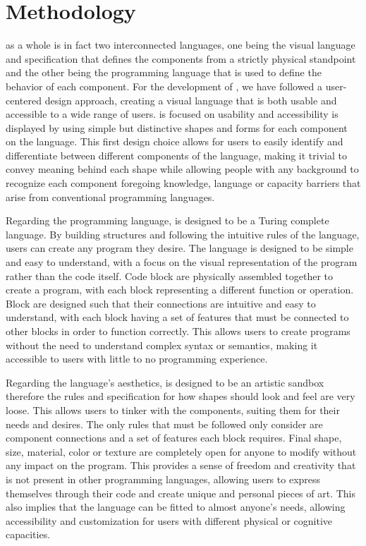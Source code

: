 \section{Methodology}
\label{sec:methodology}

\sculpt as a whole is in fact two interconnected languages, one being the visual language and specification that defines the components from a strictly physical standpoint and the other being the programming language that is used to define the behavior of each component.
For the development of \sculpt, we have followed a user-centered design approach, creating a visual language that is both usable and accessible to a wide range of users.
\sculpt is focused on usability and accessibility is displayed by using simple but distinctive shapes and forms for each component on the language.
This first design choice allows for users to easily identify and differentiate between different components of the language, making it trivial to convey meaning behind each shape while allowing people with any background to recognize each component foregoing knowledge, language or capacity barriers that arise from conventional programming languages.

Regarding the programming language, \sculpt is designed to be a Turing complete language.
By building structures and following the intuitive rules of the language, users can create any program they desire.
The language is designed to be simple and easy to understand, with a focus on the visual representation of the program rather than the code itself.
Code block are physically assembled together to create a program, with each block representing a different function or operation. Block are designed such that their connections are intuitive and easy to understand, with each block having a set of features that must be connected to other blocks in order to function correctly.
This allows users to create programs without the need to understand complex syntax or semantics, making it accessible to users with little to no programming experience.


Regarding the language's aesthetics, \sculpt is designed to be an artistic sandbox therefore the rules and specification for how shapes should look and feel are very loose. This allows users to tinker with the components, suiting them for their needs and desires.
The only rules that must be followed only consider are component connections and a set of features each block requires. Final shape, size, material, color or texture are completely open for anyone to modify without any impact on the program.
This provides a sense of freedom and creativity that is not present in other programming languages, allowing users to express themselves through their code and create unique and personal pieces of art.
This also implies that the language can be fitted to almost anyone's needs, allowing accessibility and customization for users with different physical or cognitive capacities.

